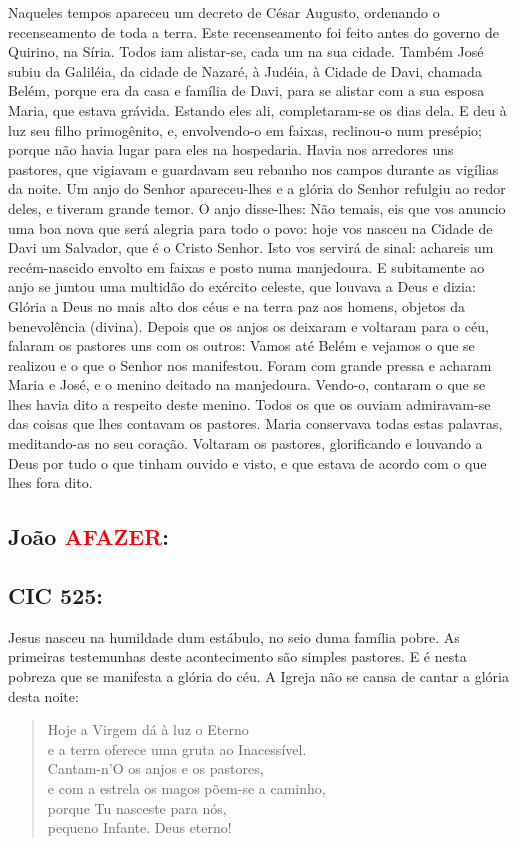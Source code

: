 \documentclass[10pt,a5paper]{book}
\newcommand{\from}[1]{\subsection*{#1}}
\newcommand{\TODO}{\textcolor{red}{\ttfamily AFAZER}}
\begin{document}
Naqueles tempos apareceu um decreto de César Augusto, ordenando o recenseamento de toda a terra.
Este recenseamento foi feito antes do governo de Quirino, na Síria.
Todos iam alistar-se, cada um na sua cidade.
Também José subiu da Galiléia, da cidade de Nazaré, à Judéia, à Cidade de Davi, chamada Belém, porque era da casa e família de Davi,
para se alistar com a sua esposa Maria, que estava grávida.
Estando eles ali, completaram-se os dias dela.
E deu à luz seu filho primogênito, e, envolvendo-o em faixas, reclinou-o num presépio; porque não havia lugar para eles na hospedaria.
Havia nos arredores uns pastores, que vigiavam e guardavam seu rebanho nos campos durante as vigílias da noite.
Um anjo do Senhor apareceu-lhes e a glória do Senhor refulgiu ao redor deles, e tiveram grande temor.
O anjo disse-lhes: Não temais, eis que vos anuncio uma boa nova que será alegria para todo o povo:
hoje vos nasceu na Cidade de Davi um Salvador, que é o Cristo Senhor.
Isto vos servirá de sinal: achareis um recém-nascido envolto em faixas e posto numa manjedoura.
E subitamente ao anjo se juntou uma multidão do exército celeste, que louvava a Deus e dizia:
Glória a Deus no mais alto dos céus e na terra paz aos homens, objetos da benevolência (divina).
Depois que os anjos os deixaram e voltaram para o céu, falaram os pastores uns com os outros: Vamos até Belém e vejamos o que se realizou e o que o Senhor nos manifestou.
Foram com grande pressa e acharam Maria e José, e o menino deitado na manjedoura.
Vendo-o, contaram o que se lhes havia dito a respeito deste menino.
Todos os que os ouviam admiravam-se das coisas que lhes contavam os pastores.
Maria conservava todas estas palavras, meditando-as no seu coração.
Voltaram os pastores, glorificando e louvando a Deus por tudo o que tinham ouvido e visto, e que estava de acordo com o que lhes fora dito.

\from{João \TODO:}

\from{CIC 525:}

Jesus nasceu na humildade dum estábulo, no seio duma família pobre.
As primeiras testemunhas deste acontecimento são simples pastores.
E é nesta pobreza que se manifesta a glória do céu.
A Igreja não se cansa de cantar a glória desta noite:

\begin{verse}
Hoje a Virgem dá à luz o Eterno \\
e a terra oferece uma gruta ao Inacessível. \\
Cantam-n'O os anjos e os pastores, \\
e com a estrela os magos põem-se a caminho, \\
porque Tu nasceste para nós, \\
pequeno Infante. Deus eterno!
\end{verse}
\end{document}
